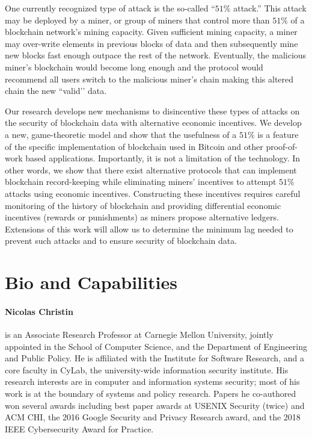 \documentclass[runningheads, 12pt]{article}
\begin{document}
One currently recognized type of attack is the so-called “$51\%$ attack.” This attack may be deployed by a miner, or group of miners that control more than $51\%$ of a blockchain network’s mining capacity. Given sufficient mining capacity, a miner may over-write elements in previous blocks of data and then subsequently mine new blocks fast enough outpace the rest of the network. Eventually, the malicious miner’s blockchain would become long enough and the protocol would recommend all users switch to the malicious miner’s chain making this altered chain the new ``valid’’ data.



Our research develops new mechanisms to disincentive these types of attacks on the security of blockchain data with alternative economic incentives. We develop a new, game-theoretic model and show that the usefulness of a $51\%$ is a feature of the specific implementation of blockchain used in Bitcoin and other proof-of-work based applications. Importantly, it is not a limitation of the technology. In other words, we show that there exist alternative protocols that can implement blockchain record-keeping while eliminating miners’ incentives to attempt $51\%$ attacks using economic incentives. Constructing these incentives requires careful monitoring of the history of blockchain and providing differential economic incentives (rewards or punishments) as miners propose alternative ledgers. Extensions of this work will allow us to determine the minimum lag needed to prevent such attacks and to ensure security of blockchain data.


\section{Bio and Capabilities}

\paragraph{Nicolas Christin} is an Associate Research Professor at Carnegie Mellon University, jointly appointed in the School of Computer Science, and the Department of Engineering and Public Policy. He is affiliated with the Institute for Software Research, and a core faculty in CyLab, the university-wide information security institute. His research interests are in computer and information systems security; most of his work is at the boundary of systems and policy research. Papers he co-authored won several awards including best paper awards at USENIX Security (twice) and ACM CHI, the 2016 Google Security and Privacy Research award, and the 2018 IEEE Cybersecurity Award for Practice.
\end{document}
